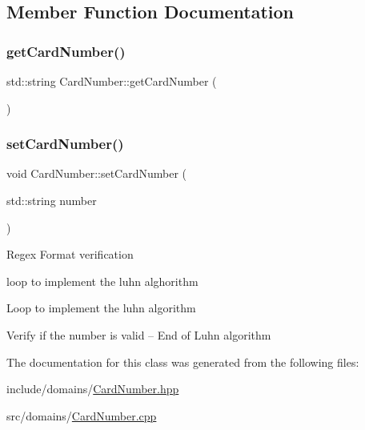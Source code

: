 \subsection{Member Function Documentation}
\mbox{\label{class_card_number_a6f77d7a124e148747e88ac96f8facef7}} 
\subsubsection{\texorpdfstring{getCardNumber()}{getCardNumber()}}
{\footnotesize\ttfamily std\+::string Card\+Number\+::get\+Card\+Number (\begin{DoxyParamCaption}{ }\end{DoxyParamCaption})}

\mbox{\label{class_card_number_ad4c2ff290a231aa91e59cc54f68c19c6}} 
\subsubsection{\texorpdfstring{setCardNumber()}{setCardNumber()}}
{\footnotesize\ttfamily void Card\+Number\+::set\+Card\+Number (\begin{DoxyParamCaption}\item[{std\+::string}]{number }\end{DoxyParamCaption})}

Regex Format verification

loop to implement the luhn alghorithm

Loop to implement the luhn algorithm

Verify if the number is valid -- End of Luhn algorithm 

The documentation for this class was generated from the following files\+:\begin{DoxyCompactItemize}
\item 
include/domains/\mbox{\hyperlink{_card_number_8hpp}{Card\+Number.\+hpp}}\item 
src/domains/\mbox{\hyperlink{_card_number_8cpp}{Card\+Number.\+cpp}}\end{DoxyCompactItemize}
